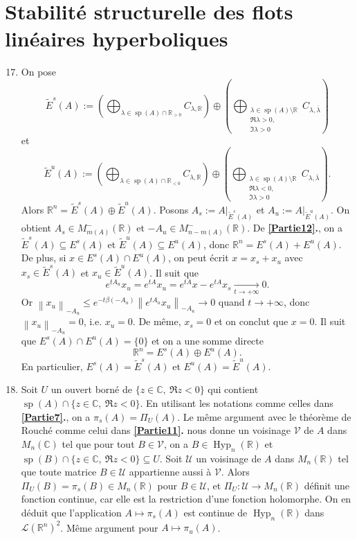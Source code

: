 \documentclass[french]{article}
\theoremstyle{definition}
\newcommand{\tuple}[1]{\left(#1\right)}
\newcommand{\norm}[1]{\left\|#1\right\|}
\newcommand{\ol}[1]{\overline{#1}}
\newcommand{\Cbb}{\mathbb{C}}
\newcommand{\Rbb}{\mathbb{R}}
\newcommand{\Lcal}{\mathcal{L}}
\newcommand{\Ucal}{\mathcal{U}}
\newcommand{\Vcal}{\mathcal{V}}
\newcommand{\Hyp}{\operatorname{Hyp}}
\newcommand{\spec}{\operatorname{sp}}
\begin{document}
\section*{Stabilit\'e structurelle des flots lin\'eaires hyperboliques}
\begin{enumerate}
    \setcounter{enumi}{16}
    \item \label{Partie17} On pose
        $$\tilde{E}^s(A):=\tuple{\bigoplus_{\lambda \in \spec(A) \cap \Rbb_{> 0}} C_{\lambda,\Rbb}} \oplus \tuple{ \bigoplus_{\substack{\lambda \in \spec(A) \setminus \Rbb \\ \Re \lambda >0,\, \\ \Im \lambda > 0}} C_{\lambda,\ol{\lambda}}}$$
    et
        $$\tilde{E}^u(A):=\tuple{\bigoplus_{\lambda \in \spec(A) \cap \Rbb_{< 0}} C_{\lambda,\Rbb}} \oplus \tuple{ \bigoplus_{\substack{\lambda \in \spec(A) \setminus \Rbb \\ \Re \lambda < 0,\, \\ \Im \lambda > 0}} C_{\lambda,\ol{\lambda}}}.$$
    Alors $\Rbb^n = \tilde{E}^s(A) \oplus \tilde{E}^u(A)$. Posons $A_s:=A|_{\tilde{E}^s(A)}$ et $A_u:=A|_{\tilde{E}^u(A)}$. On obtient $A_s \in M^-_{m(A)}(\Rbb)$ et $-A_u \in M^-_{n - m(A)}(\Rbb)$. De {\bf \ref{Partie12}.}, on a $\tilde{E}^s(A) \subseteq E^s(A)$ et $\tilde{E}^u(A) \subseteq E^u(A)$, donc $\Rbb^n = E^s(A) + E^u(A)$. De plus, si $x \in E^s(A) \cap E^u(A)$, on peut \'ecrit $x = x_s + x_u$ avec $x_s \in \tilde{E}^s(A)$ et $x_u \in \tilde{E}^u(A)$. Il suit que
        $$e^{tA_u}x_u = e^{tA}x_u = e^{tA}x - e^{tA}x_s \xrightarrow[t \to + \infty]{} 0.$$
    Or $\norm{x_u}_{-A_u} \le e^{-t\beta(-A_u)}\norm{e^{tA_u}x_u}_{-A_u} \to 0$ quand $t \to +\infty$, donc $\norm{x_u}_{-A_u} = 0$, i.e. $x_u = 0$. De m\^eme, $x_s = 0$ et on conclut que $x = 0$. Il suit que $E^s(A) \cap E^u(A) = \{0\}$ et on a une somme directe
        $$\Rbb^n = E^s(A) \oplus E^u(A).$$
    En particulier, $E^s(A) = \tilde{E}^s(A)$ et $E^u(A) = \tilde{E}^u(A)$.
    
    \item \label{Partie18} Soit $U$ un ouvert born\'e de $\{z \in \Cbb,\ \Re z < 0\}$ qui contient $\spec(A) \cap \{z \in \Cbb,\ \Re z < 0\}$. En utilisant les notations comme celles dans {\bf \ref{Partie7}.}, on a $\pi_s(A) = \Pi_U(A)$. Le m\^eme argument avec le th\'eor\`eme de Rouch\'e comme celui dans {\bf \ref{Partie11}.} nous donne un voisinage $\Vcal$ de $A$ dans $M_n(\Cbb)$ tel que pour tout $B \in \Vcal$, on a $B \in \Hyp_n(\Rbb)$ et $\spec(B) \cap \{z \in \Cbb,\ \Re z < 0\} \subseteq U$. Soit $\Ucal$ un voisinage de $A$ dans $M_n(\Rbb)$ tel que toute matrice $B \in \Ucal$ appartienne aussi \`a $\Vcal$. Alors $\Pi_U(B) = \pi_s(B) \in M_n(\Rbb)$ pour $B \in \Ucal$, et $\Pi_U: \Ucal \to M_n(\Rbb)$ d\'efinit une fonction continue, car elle est la restriction d'une fonction holomorphe. On en d\'eduit que l'application $A \mapsto \pi_s(A)$ est continue de $\Hyp_n(\Rbb)$ dans $\Lcal(\Rbb^n)^2$. M\^eme argument pour $A \mapsto \pi_u(A)$.
    

\end{enumerate}
\end{document}
